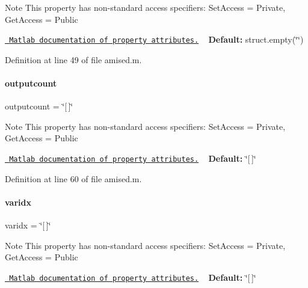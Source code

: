 \begin{DoxyNote}{Note}
This property has non-\/standard access specifiers\+: {\ttfamily Set\+Access = Private, Get\+Access = Public} 

\href{http://www.mathworks.com/help/matlab/matlab_oop/property-attributes.html}{\texttt{ Matlab documentation of property attributes.}} ~\newline
{\bfseries{Default\+:}} struct.\+empty(\char`\"{}\char`\"{}) 
\end{DoxyNote}


Definition at line 49 of file amised.\+m.

\mbox{\label{classamised_a2d1dd5be3732d16dc0d0feea17e03f04}} 
\paragraph{\texorpdfstring{outputcount}{outputcount}}
{\footnotesize\ttfamily outputcount = \char`\"{}\mbox{[}$\,$\mbox{]}\char`\"{}}

\begin{DoxyNote}{Note}
This property has non-\/standard access specifiers\+: {\ttfamily Set\+Access = Private, Get\+Access = Public} 

\href{http://www.mathworks.com/help/matlab/matlab_oop/property-attributes.html}{\texttt{ Matlab documentation of property attributes.}} ~\newline
{\bfseries{Default\+:}} \char`\"{}\mbox{[}$\,$\mbox{]}\char`\"{} 
\end{DoxyNote}


Definition at line 60 of file amised.\+m.

\mbox{\label{classamised_ad29088fdb92d731f3c64c6d2bd2ab43c}} 
\paragraph{\texorpdfstring{varidx}{varidx}}
{\footnotesize\ttfamily varidx = \char`\"{}\mbox{[}$\,$\mbox{]}\char`\"{}}

\begin{DoxyNote}{Note}
This property has non-\/standard access specifiers\+: {\ttfamily Set\+Access = Private, Get\+Access = Public} 

\href{http://www.mathworks.com/help/matlab/matlab_oop/property-attributes.html}{\texttt{ Matlab documentation of property attributes.}} ~\newline
{\bfseries{Default\+:}} \char`\"{}\mbox{[}$\,$\mbox{]}\char`\"{} 
\end{DoxyNote}



